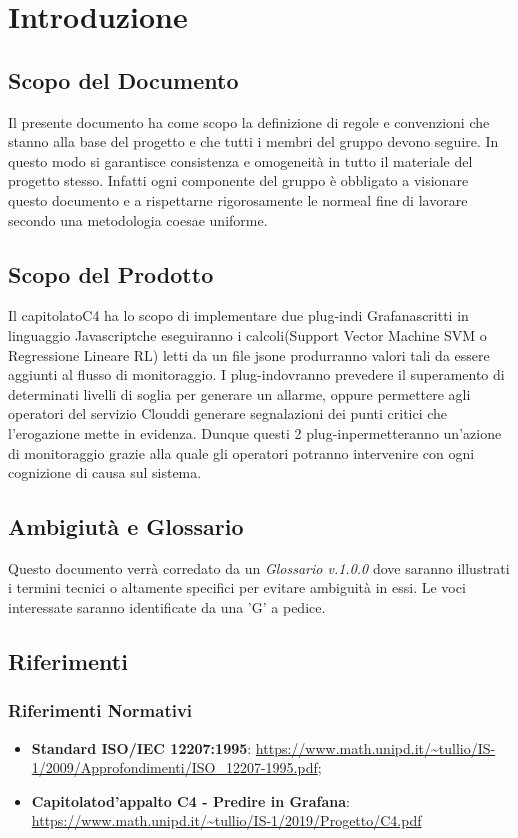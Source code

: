 \section{Introduzione}
\subsection{Scopo del Documento}
Il presente documento ha come scopo la definizione di regole e convenzioni che stanno alla base del progetto e che tutti i membri del gruppo devono seguire. In questo modo si garantisce consistenza e omogeneità in tutto il materiale del progetto stesso. Infatti ogni componente del gruppo è obbligato a visionare questo documento e a rispettarne rigorosamente le norme\glosp al fine di lavorare secondo una metodologia coesa\glosp e uniforme.
\subsection{Scopo del Prodotto}
Il capitolato\glosp C4 ha lo scopo di implementare due plug-in\glosp di Grafana\glosp scritti in linguaggio Javascript\glosp che eseguiranno i calcoli(Support Vector Machine SVM o Regressione Lineare RL) letti da un file json\glosp e produrranno valori tali da essere aggiunti al flusso di monitoraggio. I plug-in\glosp dovranno prevedere il superamento di determinati livelli di soglia per generare un allarme, oppure permettere agli operatori del servizio Cloud\glosp di generare segnalazioni dei punti critici che l'erogazione mette in evidenza.
Dunque questi 2 plug-in\glosp permetteranno un'azione di monitoraggio grazie alla quale gli operatori potranno intervenire con ogni cognizione di causa sul sistema.
\subsection{Ambigiutà e Glossario}
Questo documento verrà corredato da un \textit{Glossario v.1.0.0} dove saranno illustrati i termini tecnici o altamente specifici per evitare ambiguità in essi. Le voci interessate saranno identificate da una 'G' a pedice.
\subsection{Riferimenti}
\subsubsection{Riferimenti Normativi}
\begin{itemize}
	\item \textbf{Standard ISO/IEC 12207:1995}: 
	\url{https://www.math.unipd.it/~tullio/IS-1/2009/Approfondimenti/ISO_12207-1995.pdf};
	\item \textbf{Capitolato\glosp d'appalto C4 - Predire in Grafana}:  \url{https://www.math.unipd.it/~tullio/IS-1/2019/Progetto/C4.pdf}
\end{itemize}

